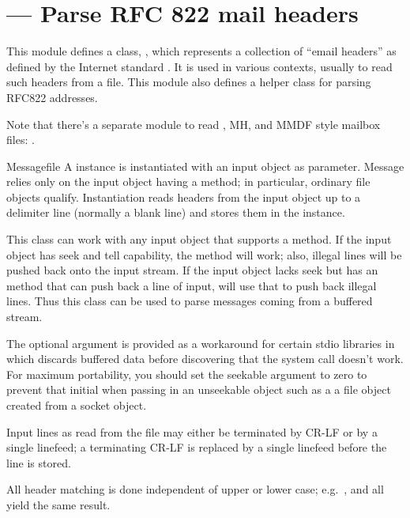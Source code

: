 \section{ ---
         Parse RFC 822 mail headers}


This module defines a class, , which represents a
collection of ``email headers'' as defined by the Internet standard
.  It is used in various contexts, usually to read such
headers from a file.  This module also defines a helper class 
 for parsing RFC822 addresses.

Note that there's a separate module to read \UNIX{}, MH, and MMDF
style mailbox files: .

\begin{classdesc}{Message}{file}
A  instance is instantiated with an input object as
parameter.  Message relies only on the input object having a
 method; in particular, ordinary file objects
qualify.  Instantiation reads headers from the input object up to a
delimiter line (normally a blank line) and stores them in the
instance.

This class can work with any input object that supports a
 method.  If the input object has seek and tell
capability, the  method will work; also, illegal
lines will be pushed back onto the input stream.  If the input object
lacks seek but has an  method that can push back a
line of input,  will use that to push back illegal
lines.  Thus this class can be used to parse messages coming from a
buffered stream.

The optional  argument is provided as a workaround for
certain stdio libraries in which  discards buffered
data before discovering that the  system call
doesn't work.  For maximum portability, you should set the seekable
argument to zero to prevent that initial  when passing
in an unseekable object such as a a file object created from a socket
object.

Input lines as read from the file may either be terminated by CR-LF or
by a single linefeed; a terminating CR-LF is replaced by a single
linefeed before the line is stored.

All header matching is done independent of upper or lower case;
e.g.\ ,  and
 all yield the same result.
\end{classdesc}

